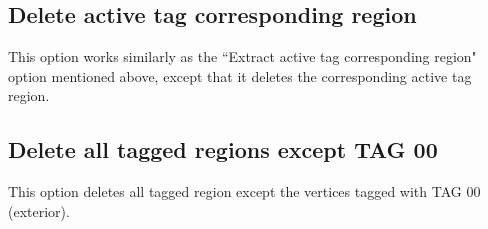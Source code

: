 \subsection{Delete active tag corresponding region}
This option works similarly as the ``Extract active tag corresponding region" option mentioned above, except that it deletes the corresponding active tag region.

\subsection{Delete all tagged regions except TAG 00}
This option deletes all tagged region except the vertices tagged with TAG 00 (exterior).